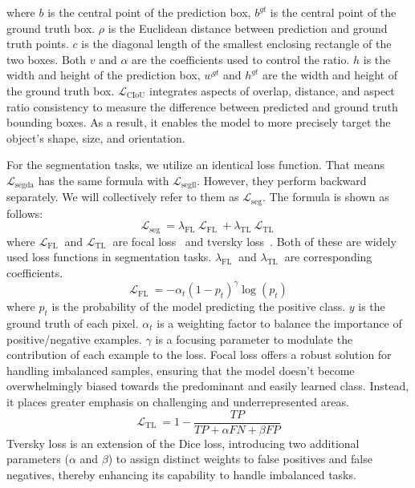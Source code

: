 \documentclass[lettersize,journal]{IEEEtran}
\begin{document}
where $b$ is the central point of the prediction box, $b^{g t}$ is the central point of the ground truth box. $\rho$ is the Euclidean distance between prediction and ground truth points. $c$ is the diagonal length of the smallest enclosing rectangle of the two boxes. Both $v$ and $\alpha$ are the coefficients used to control the ratio. $h$ is the width and height of the prediction box, $w^{g t}$ and $h^{g t}$ are the width and height of the ground truth box. \( \mathcal{L}_{\text{CIoU}} \) integrates aspects of overlap, distance, and aspect ratio consistency to measure the difference between predicted and ground truth bounding boxes. As a result, it enables the model to more precisely target the object's shape, size, and orientation. 


For the segmentation tasks, we utilize an identical loss function. That means $\mathcal{L}_{\text {segda}}$ has the same formula with $\mathcal{L}_{\text {segll}}$. However, they perform backward separately. We will collectively refer to them as $\mathcal{L}_{\text {seg}}$. The formula is shown as follows:
\begin{equation}
\mathcal{L}_{\text {seg }}=\lambda_{\text {FL }} \mathcal{L}_{\text {FL }}+\lambda_{\text {TL }} \mathcal{L}_{\text {TL }}
\end{equation}
where $\mathcal{L}_{\text {FL }}$ and $\mathcal{L}_{\text {TL }}$ are focal loss~\cite{lin2017focal} and tversky loss~\cite{salehi2017tversky}. Both of these are widely used loss functions in segmentation tasks. $\lambda_{\text {FL }}$ and $\lambda_{\text {TL }}$ are corresponding coefficients. 
\begin{equation}
\mathcal{L}_{\text {FL }}=-\alpha_t\left(1-p_t\right)^\gamma \log \left(p_t\right)
\end{equation}
where $p_t$ is the probability of the model predicting the positive class. $y$ is the ground truth of each pixel. $\alpha_t$ is a weighting factor to balance the importance of positive/negative examples. $\gamma$ is a focusing parameter to modulate the contribution of each example to the loss. Focal loss offers a robust solution for handling imbalanced samples, ensuring that the model doesn't become overwhelmingly biased towards the predominant and easily learned class. Instead, it places greater emphasis on challenging and underrepresented areas. 
\begin{equation}
\mathcal{L}_{\text {TL }}=1- \frac{T P}{T P+\alpha F N+\beta F P}
\end{equation}
Tversky loss is an extension of the Dice loss, introducing two additional parameters ($\alpha$ and $\beta$) to assign distinct weights to false positives and false negatives, thereby enhancing its capability to handle imbalanced tasks.
\end{document}
